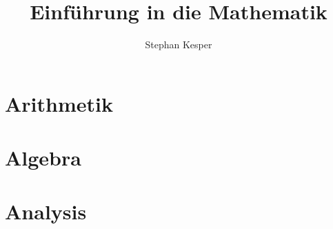 \documentclass[graybox,envcountchap,sectrefs,deutsch]{svmono}
\begin{document}
\author{Stephan Kesper}
\title{Einführung in die Mathematik}
\subtitle{}
\maketitle

\frontmatter



\tableofcontents

\mainmatter

\part{Arithmetik}



\part{Algebra}



\part{Analysis}

\backmatter
\end{document}
